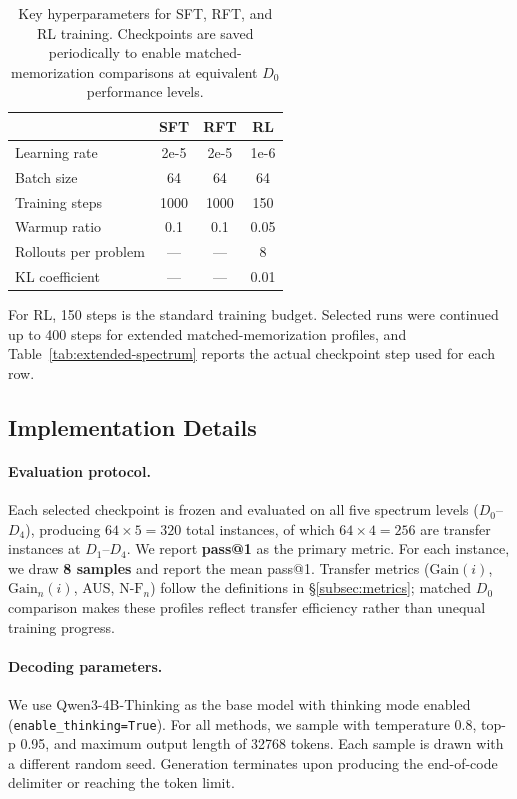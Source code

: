 \documentclass[]{bytedance_seed}
\theoremstyle{plain}
\theoremstyle{definition}
\theoremstyle{remark}
\begin{document}
\begin{table}[h]
\centering
\small
\caption{Key hyperparameters for SFT, RFT, and RL training. Checkpoints are saved periodically to enable matched-memorization comparisons at equivalent $D_0$ performance levels.}
\label{tab:hyperparameters}
\begin{tabular}{lccc}
\toprule
 & \textbf{SFT} & \textbf{RFT} & \textbf{RL} \\
\midrule
Learning rate & 2e-5 & 2e-5 & 1e-6 \\
Batch size & 64 & 64 & 64 \\
Training steps & 1000 & 1000 & 150 \\
Warmup ratio & 0.1 & 0.1 & 0.05 \\
Rollouts per problem & --- & --- & 8 \\
KL coefficient & --- & --- & 0.01 \\
\bottomrule
\end{tabular}
\end{table}

For RL, 150 steps is the standard training budget. Selected runs were continued up to 400 steps for extended matched-memorization profiles, and Table~\ref{tab:extended-spectrum} reports the actual checkpoint step used for each row.


\subsection{Implementation Details}
\label{app:implementation}

\paragraph{Evaluation protocol.}
Each selected checkpoint is frozen and evaluated on all five spectrum levels ($D_0$--$D_4$), producing $64 \times 5 = 320$ total instances, of which $64 \times 4 = 256$ are transfer instances at $D_1$--$D_4$. We report \textbf{pass@1} as the primary metric. For each instance, we draw \textbf{8 samples} and report the mean pass@1. Transfer metrics ($\text{Gain}(i)$, $\text{Gain}_n(i)$, AUS, $\text{N-F}_n$) follow the definitions in \S\ref{subsec:metrics}; matched $D_0$ comparison makes these profiles reflect transfer efficiency rather than unequal training progress.

\paragraph{Decoding parameters.}
We use Qwen3-4B-Thinking as the base model with thinking mode enabled (\texttt{enable\_thinking=True}). For all methods, we sample with temperature 0.8, top-p 0.95, and maximum output length of 32768 tokens. Each sample is drawn with a different random seed. Generation terminates upon producing the end-of-code delimiter or reaching the token limit.
\end{document}
